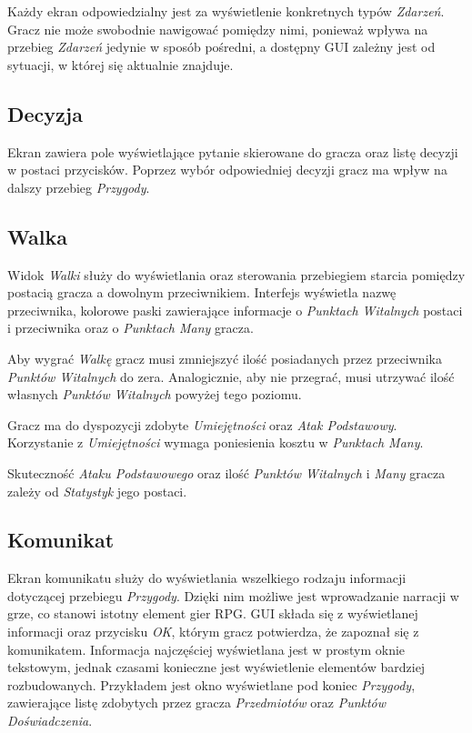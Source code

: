 \documentclass[openright]{xmgr}
\begin{document}
Każdy ekran odpowiedzialny jest za wyświetlenie konkretnych typów \textit{Zdarzeń}. Gracz nie może swobodnie nawigować pomiędzy nimi, ponieważ wpływa na przebieg \textit{Zdarzeń} jedynie w sposób pośredni, a dostępny GUI zależny jest od sytuacji, w której się aktualnie znajduje.
\subsection*{Decyzja}
Ekran zawiera pole wyświetlające pytanie skierowane do gracza oraz listę decyzji w postaci przycisków. Poprzez wybór odpowiedniej decyzji gracz ma wpływ na dalszy przebieg \textit{Przygody}.
\subsection*{Walka}
Widok \textit{Walki} służy do wyświetlania oraz sterowania przebiegiem starcia pomiędzy postacią gracza a dowolnym przeciwnikiem. Interfejs wyświetla nazwę przeciwnika, kolorowe paski zawierające informacje o \textit{Punktach Witalnych} postaci i przeciwnika oraz o \textit{Punktach Many} gracza. 

Aby wygrać \textit{Walkę} gracz musi zmniejszyć ilość posiadanych przez przeciwnika \textit{Punktów Witalnych} do zera. Analogicznie, aby nie przegrać, musi utrzywać ilość własnych \textit{Punktów Witalnych}
powyżej tego poziomu.

Gracz ma do dyspozycji zdobyte \textit{Umiejętności} oraz \textit{Atak Podstawowy}. Korzystanie z \textit{Umiejętności} wymaga poniesienia kosztu w \textit{Punktach Many}.

Skuteczność \textit{Ataku Podstawowego} oraz ilość \textit{Punktów Witalnych} i \textit{Many} gracza zależy od \textit{Statystyk} jego postaci.

\subsection*{Komunikat}

Ekran komunikatu służy do wyświetlania wszelkiego rodzaju informacji dotyczącej przebiegu \textit{Przygody}. Dzięki nim możliwe jest wprowadzanie narracji w grze, co stanowi istotny element gier RPG. GUI składa się z wyświetlanej informacji oraz przycisku \textit{OK}, którym gracz potwierdza, że zapoznał się z komunikatem. Informacja najczęściej wyświetlana jest w prostym oknie tekstowym, jednak czasami konieczne jest wyświetlenie elementów bardziej rozbudowanych. Przykładem jest okno wyświetlane pod koniec \textit{Przygody}, zawierające listę zdobytych przez gracza \textit{Przedmiotów} oraz \textit{Punktów Doświadczenia}.
\end{document}
